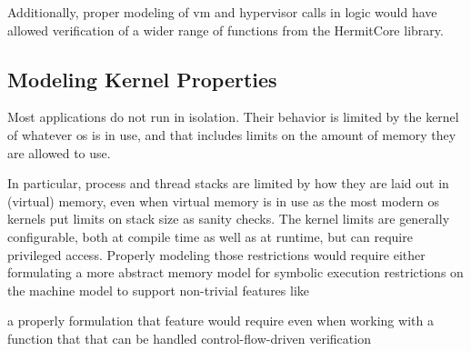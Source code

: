 

Additionally, proper modeling of \ac{vm} and hypervisor calls in logic
would have allowed verification of a wider range of functions
from the HermitCore library.

\subsection{Modeling Kernel Properties}
Most applications do not run in isolation. Their behavior is limited by
the kernel of whatever \ac{os} is in use,
and that includes limits on the amount of memory they are allowed to use.

In particular, process and thread stacks are limited
by how they are laid out in (virtual) memory,
even when virtual memory is in use as the 
most modern \ac{os} kernels put limits on stack size as sanity checks.
The kernel limits are generally configurable,
both at compile time as well as at runtime, but can require privileged access.
Properly modeling those restrictions
would require either formulating a more abstract memory model
for symbolic execution 
restrictions on the 
machine model to support non-trivial features
like 

a properly formulation that feature would require 
even when working with a function that
that can be handled control-flow-driven verification
